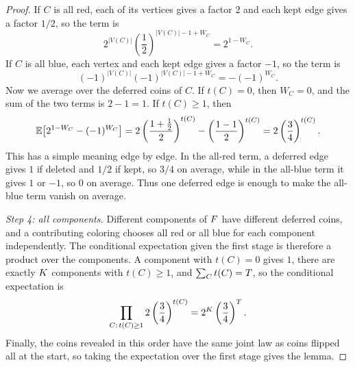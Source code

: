 \begin{proof}
If \(C\) is all red, each of its vertices gives a factor \(2\) and each kept
edge gives a factor \(1/2\), so the term is
\[
  2^{|V(C)|}\left(\frac12\right)^{|V(C)|-1+W_C}=2^{1-W_C}.
\]
If \(C\) is all blue, each vertex and each kept edge gives a factor \(-1\), so
the term is
\[
  (-1)^{|V(C)|}(-1)^{|V(C)|-1+W_C}=-(-1)^{W_C}.
\]
Now we average over the deferred coins of \(C\). If \(t(C)=0\), then
\(W_C=0\), and the sum of the two terms is \(2-1=1\). If \(t(C)\ge1\), then
\[
  \Ex{2^{1-W_C}-(-1)^{W_C}}
  =2\left(\frac{1+\frac12}{2}\right)^{t(C)}
    -\left(\frac{1-1}{2}\right)^{t(C)}
  =2\left(\frac34\right)^{t(C)}.
\]
This has a simple meaning edge by edge. In the all-red term, a deferred edge
gives \(1\) if deleted and \(1/2\) if kept, so \(3/4\) on average, while in the
all-blue term it gives \(1\) or \(-1\), so \(0\) on average. Thus one deferred
edge is enough to make the all-blue term vanish on average.

\emph{Step 4: all components.} Different components of \(F\) have different
deferred coins, and a contributing coloring chooses all red or all blue for
each component independently. The conditional expectation given the first
stage is therefore a product over the components. A component with
\(t(C)=0\) gives \(1\), there are exactly \(K\) components with
\(t(C)\ge1\), and \(\sum_C t(C)=T\), so the conditional expectation is
\[
  \prod_{C:\,t(C)\ge1}2\left(\frac34\right)^{t(C)}
  =2^K\left(\frac34\right)^T.
\]
Finally, the coins revealed in this order have the same joint law as coins
flipped all at the start, so taking the expectation over the first stage gives
the lemma.
\end{proof}
